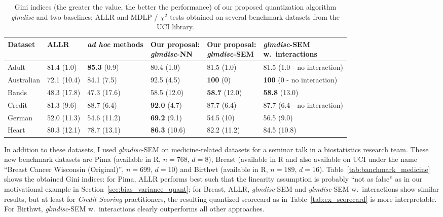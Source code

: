 \begin{table}
    \centering
        \caption{Gini indices (the greater the value, the better the performance) of our proposed quantization algorithm \textit{glmdisc} and two baselines: ALLR and MDLP / $\chi^2$ tests obtained on several benchmark datasets from the UCI library.}
    \label{tab:banchmark_inter}
\begin{small}
\begin{tabular}{llllll}
Dataset & ALLR & \textit{ad hoc} methods & \makecell{Our proposal:\\ \textit{glmdisc}-NN} & \makecell{Our proposal:\\ \textit{glmdisc}-SEM} & \makecell{\textit{glmdisc}-SEM\\ w.\ interactions} \\
\hline
Adult & 81.4 (1.0) & \textbf{85.3} (0.9) & 80.4 (1.0) & 81.5 (1.0) & 81.5 (1.0 - no interaction) \\
Australian & 72.1 (10.4) & 84.1 (7.5) & 92.5 (4.5) & \textbf{100} (0) & \textbf{100} (0 - no interaction) \\
Bands & 48.3 (17.8) & 47.3 (17.6) & 58.5 (12.0) & \textbf{58.7} (12.0) & \textbf{58.8} (13.0) \\
Credit & 81.3 (9.6) & 88.7 (6.4) & \textbf{92.0} (4.7) & 87.7 (6.4) & 87.7 (6.4 - no interaction) \\
German & 52.0 (11.3) & 54.6 (11.2) & \textbf{69.2} (9.1) & 54.5 (10) & 56.5 (9.0) \\
Heart & 80.3 (12.1) & 78.7 (13.1) & \textbf{86.3} (10.6) & 82.2 (11.2) & 84.5 (10.8)
\end{tabular}
\end{small}
\end{table}


In addition to these datasets, I used \textit{glmdisc}-SEM on medicine-related datasets for a seminar talk in a biostatistics research team. These new benchmark datasets are Pima (available in \textsf{R}, $n=768$, $d=8$), Breast (available in \textsf{R} and also available on UCI under the name ``Breast Cancer Wisconsin (Original)'', $n=699$, $d=10$) and Birthwt (available in \textsf{R}, $n=189$, $d=16$). Table~\ref{tab:banchmark_medicine} shows the obtained Gini indices: for Pima, ALLR performs best such that the linearity assumption is probably ``not as false'' as in our motivational example in Section~\ref{sec:bias_variance_quant}; for Breast, ALLR, \textit{glmdisc}-SEM and \textit{glmdisc}-SEM w.\ interactions show similar results, but at least for \textit{Credit Scoring} practitioners, the resulting quantized scorecard as in Table~\ref{tab:ex_scorecard} is more interpretable. For Birthwt, \textit{glmdisc}-SEM w.\ interactions clearly outperforms all other approaches.

